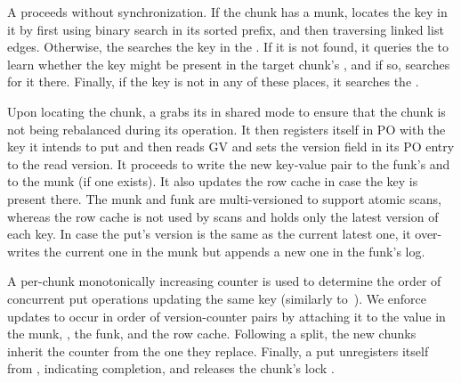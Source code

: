 A  proceeds without synchronization. If the chunk has a munk,     locates the key in it by first using binary search in its sorted prefix, and then traversing linked list edges. 
Otherwise, the  searches the key in the . If it is not found, it queries 
the  to learn whether the key might be present in the target chunk's  
 , and if so, searches for it there.  Finally, if the key is not in any of these places, it searches
 the  .


Upon locating the chunk,  a  grabs its  in shared mode to ensure that the chunk is not being rebalanced during its operation. It then registers itself in PO with the key it intends to put
and then reads GV and sets the version field in its PO entry to the read version. 
It proceeds to write the new key-value pair to the  funk's  and to the 
munk (if one exists). 
It also updates the row cache in case the key is present there. 
The munk and funk are multi-versioned to support atomic scans, 
whereas the row cache is not used by scans and holds only the latest version of each key. 
In case the put's version is the same as the current latest one, it over-writes the current one in the munk
but appends a new one in the funk's log. 

A per-chunk monotonically increasing counter is used to determine 
the order of concurrent put operations updating the same key (similarly to~\cite{kiwi}).
We  enforce updates to occur in order of version-counter pairs by attaching it to the value in the munk, 
, the funk, and the row cache.
Following a split, the new chunks inherit the counter from the one they replace.  
Finally, a put unregisters itself from , indicating completion, 
and releases the chunk's lock .


